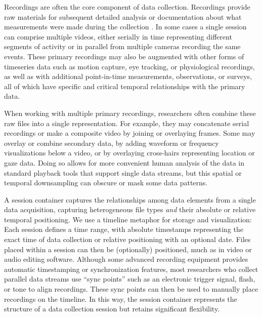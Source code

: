 \documentclass{sig-alternate}
\begin{document}
Recordings are often the core component of data collection.
Recordings provide raw materials for subsequent detailed analysis or documentation about what measurements were made during the collection \cite{Bakeman_2012}.
In some cases a single session can comprise multiple videos, either serially in time representing different segments of activity or in parallel from multiple cameras recording the same events.
These primary recordings may also be augmented with other forms of timeseries data such as motion capture, eye tracking, or physiological recordings, as well as with additional point-in-time measurements, observations, or surveys, all of which have specific and critical temporal relationships with the primary data.

When working with multiple primary recordings, researchers often combine these raw files into a single representation.
For example, they may concatenate serial recordings or make a composite video by joining or overlaying frames.
Some may overlay or combine secondary data, by adding waveform or frequency visualizations below a video, or by overlaying cross-hairs representing location or gaze data.
Doing so allows for more convenient human analysis of the data in standard playback tools that support single data streams, but this spatial or temporal downsampling can obscure or mask some data patterns.

A session container captures the relationships among data elements from a single data acquisition, capturing heterogeneous file types \emph{and} their absolute or relative temporal positioning.
We use a timeline metaphor for storage and visualization: Each session defines a time range, with absolute timestamps representing the exact time of data collection or relative positioning with an optional date.
Files placed within a session can then be (optionally) positioned, much as in video or audio editing software.
Although some advanced recording equipment provides automatic timestamping or synchronization features, most researchers who collect parallel data streams use ``sync points'' such as an electronic trigger signal, flash, or tone to align recordings.
These sync points can then be used to manually place recordings on the timeline.
In this way, the session container represents the structure of a data collection session but retains significant flexibility.
\end{document}
